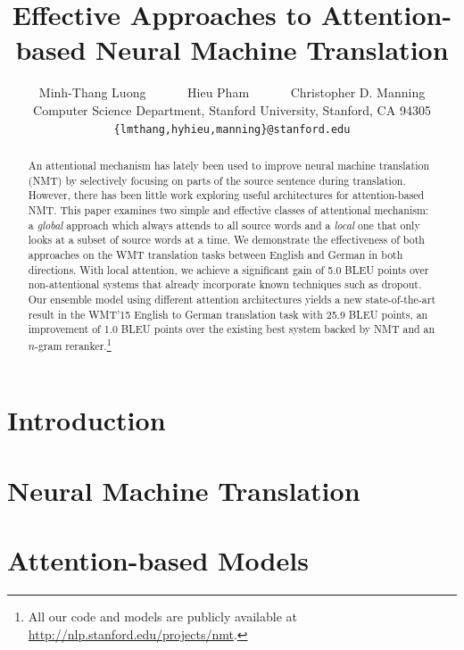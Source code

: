 \documentclass[11pt,a4paper]{article}
\title{Effective Approaches to Attention-based Neural Machine Translation}
\author{Minh-Thang Luong $\mbox{ }$ $\mbox{ }$ $\mbox{ }$ Hieu Pham $\mbox{ }$ $\mbox{ }$ $\mbox{ }$ Christopher D. Manning\\
  Computer Science Department, Stanford University, Stanford, CA 94305 \\
  {\tt \{lmthang,hyhieu,manning\}@stanford.edu} 
}
\date{}
\newcommand{\sotanew}{25.9} %
\newcommand{\attngain}{5.0} %
\begin{document}
\maketitle
\begin{abstract}
An attentional mechanism has lately been used to improve neural machine translation (NMT)
by
selectively focusing on parts of the source sentence during translation. However,
there has been little work exploring useful architectures for attention-based
NMT. This paper examines two simple and effective classes of attentional
mechanism: a {\it global} approach which always attends to all source words and
a {\it local} one that only looks at a subset of source words at a time. 
We demonstrate the effectiveness of both approaches on the WMT translation
tasks between English and German in both directions. With local
attention, we achieve a significant gain of \attngain{} BLEU points over
non-attentional systems that 
already incorporate known techniques such as dropout. Our ensemble 
model using different attention architectures yields a new
state-of-the-art result in the WMT'15 English to German
translation task with \sotanew{} BLEU points, an improvement of 1.0 BLEU points over the existing
best system backed by NMT and an $n$-gram reranker.\footnote{All our code and models
are publicly available at \url{http://nlp.stanford.edu/projects/nmt}.}

\end{abstract}

\section{Introduction}
\label{sec:intro}


\section{Neural Machine Translation}
\label{sec:nmt}


\section{Attention-based Models}
\label{sec:attn}

\end{document}

